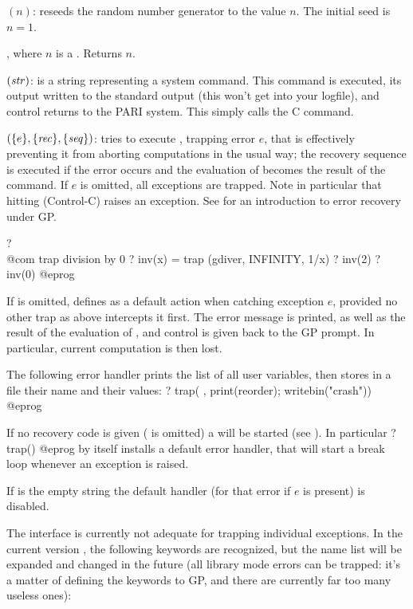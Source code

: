 $(n)$: reseeds the random number generator to the value
$n$. The initial seed is $n=1$.

, where $n$ is a . Returns $n$.

$(\hbox{\it str\/})$:  is a string representing
a system command. This command is executed, its output written to the
standard output (this won't get into your logfile), and control returns
to the PARI system. This simply calls the C  command.

$(\{e\}, \{\hbox{\it rec\/}\}, \{\hbox{\it seq\/}\})$: tries to
execute , trapping error $e$, that is effectively preventing it
from aborting computations in the usual way; the recovery sequence
 is executed if the error occurs and the evaluation of 
becomes the result of the command. If $e$ is omitted, all exceptions are
trapped. Note in particular that hitting  (Control-C) raises an
exception. See  for an introduction to error recovery
under GP.

\bprog
? \\@com trap division by 0
? inv(x) = trap (gdiver, INFINITY, 1/x)
? inv(2)
? inv(0)
@eprog

If  is omitted, defines  as a default action when
catching exception $e$, provided no other trap as above intercepts it first.
The error message is printed, as well as the result of the evaluation of
, and control is given back to the GP prompt. In particular, current
computation is then lost.

The following error handler prints the list of all user variables, then
stores in a file their name and their values:
\bprog
? { trap( ,
      print(reorder);
      writebin("crash")) }
@eprog

If no recovery code is given ( is omitted) a  will
be started (see ). In particular
\bprog
? trap()
@eprog
\noindent by itself installs a default error handler, that will start a break
loop whenever an exception is raised.

If  is the empty string  the default handler (for that error
if $e$ is present) is disabled.

 The interface is currently not adequate for trapping
individual exceptions. In the current version \vers, the following keywords
are recognized, but the name list will be expanded and changed in the
future (all library mode errors can be trapped: it's a matter of defining
the keywords to GP, and there are currently far too many useless ones):

